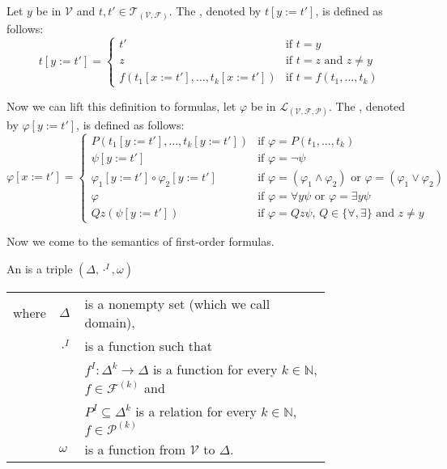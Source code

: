 \begin{definition}
	Let $y$ be in $\mathcal{V}$ and $t,t'\in\mathcal{T}_{(\mathcal{V},\mathcal{F})}$. The , denoted by $t\left[y:=t'\right]$, is defined as follows:
	\[t\left[y:=t'\right]=
		\begin{cases}
			t'                                                   & \text{if $t=y$}                \\ 
			z                                                    & \text{if $t=z$ and $z\neq y$}  \\%
			f(t_1\left[x:=t'\right],\dots,t_k\left[x:=t'\right]) & \text{if $t=f(t_1,\dots,t_k)$} 
		\end{cases}\]
	
	Now we can lift this definition to formulas, let $\varphi$ be in $\mathcal{L}_{(\mathcal{V},\mathcal{F},\mathcal{P})}$. The , denoted by $\varphi\left[y:=t'\right]$, is defined as follows:
	\[\varphi\left[x:=t'\right]=
		\begin{cases}
			P(t_1\left[y:=t'\right],\dots,t_k\left[y:=t'\right])        & \text{if $\varphi=P(t_1,\dots,t_k)$}                                     \\
			\psi\left[y:=t'\right]                                      & \text{if $\varphi=\neg\psi$}                                             \\
			\varphi_1\left[y:=t'\right]\circ\varphi_2\left[y:=t'\right] & \text{if $\varphi=(\varphi_1\wedge\varphi_2)$ or $\varphi=(\varphi_1\vee\varphi_2)$} \\
			\varphi                                                     & \text{if $\varphi=\forall y\psi$ or $\varphi=\exists y\psi$}                   \\
			Q z(\psi\left[y:=t'\right])                                 & \text{if $\varphi=Q z\psi$, $Q\in\{\forall,\exists\}$ and $z\neq y$}     
		\end{cases}\]

\end{definition}
Now we come to the semantics of first-order formulas.
\begin{definition}
	An  is a triple $(\Delta,\cdot^I,\omega)$
	\begin{tabular}{llp{0.78\linewidth}}
		where & $\Delta$  & is a nonempty set (which we call  domain),                                                     \\
& $\cdot^I$ & is a function such that                                                                        \\
&           & $f^I:\Delta^k\to\Delta$  is a function for every $k\in\mathbb{N}$, $f\in\mathcal{F}^{(k)}$ and \\
&           & $P^I\subseteq\Delta^k$ is a relation for every $k\in\mathbb{N}$, $f\in\mathcal{P}^{(k)}$       \\
& $\omega$  & is a function from $\mathcal{V}$ to $\Delta$.                                                  
	\end{tabular}
\end{definition}
